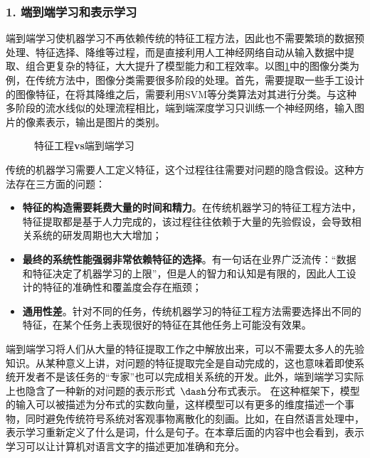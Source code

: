 
\subsubsection{1. 端到端学习和表示学习}

\parinterval 端到端学习使机器学习不再依赖传统的特征工程方法，因此也不需要繁琐的数据预处理、特征选择、降维等过程，而是直接利用人工神经网络自动从输入数据中提取、组合更复杂的特征，大大提升了模型能力和工程效率。以图\ref{fig:9-2}中的图像分类为例，在传统方法中，图像分类需要很多阶段的处理。首先，需要提取一些手工设计的图像特征，在将其降维之后，需要利用SVM等分类算法对其进行分类。与这种多阶段的流水线似的处理流程相比，端到端深度学习只训练一个神经网络，输入图片的像素表示，输出是图片的类别。

\begin{figure}[htp]
\centering

\caption{特征工程{\small\sffamily\bfseries{vs}}端到端学习}
\label{fig:9-2}
\end{figure}

\parinterval 传统的机器学习需要人工定义特征，这个过程往往需要对问题的隐含假设。这种方法存在三方面的问题：

\begin{itemize}
\vspace{0.5em}
\item {\small\sffamily\bfseries{特征的构造需要耗费大量的时间和精力}}。在传统机器学习的特征工程方法中，特征提取都是基于人力完成的，该过程往往依赖于大量的先验假设，会导致相关系统的研发周期也大大增加；
\vspace{0.5em}
\item {\small\sffamily\bfseries{最终的系统性能强弱非常依赖特征的选择}}。有一句话在业界广泛流传：“数据和特征决定了机器学习的上限”，但是人的智力和认知是有限的，因此人工设计的特征的准确性和覆盖度会存在瓶颈；
\vspace{0.5em}
\item {\small\sffamily\bfseries{通用性差}}。针对不同的任务，传统机器学习的特征工程方法需要选择出不同的特征，在某个任务上表现很好的特征在其他任务上可能没有效果。
\vspace{0.5em}
\end{itemize}

\parinterval 端到端学习将人们从大量的特征提取工作之中解放出来，可以不需要太多人的先验知识。从某种意义上讲，对问题的特征提取完全是自动完成的，这也意味着即使系统开发者不是该任务的“专家”也可以完成相关系统的开发。此外，端到端学习实际上也隐含了一种新的对问题的表示形式\ $\dash$分布式表示。 在这种框架下，模型的输入可以被描述为分布式的实数向量，这样模型可以有更多的维度描述一个事物，同时避免传统符号系统对客观事物离散化的刻画。比如，在自然语言处理中，表示学习重新定义了什么是词，什么是句子。在本章后面的内容中也会看到，表示学习可以让计算机对语言文字的描述更加准确和充分。

